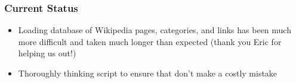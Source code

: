 \documentclass{beamer}
\begin{document}
\begin{frame}
  \frametitle{Current Status}
  \begin{itemize}
  \item Loading database of Wikipedia pages, categories, and links has been much
    more difficult and taken much longer than expected (thank you Eric for
    helping us out!)
    \item Thoroughly thinking script to ensure that don't make a costly mistake
  \end{itemize}

\end{frame}
\end{document}
